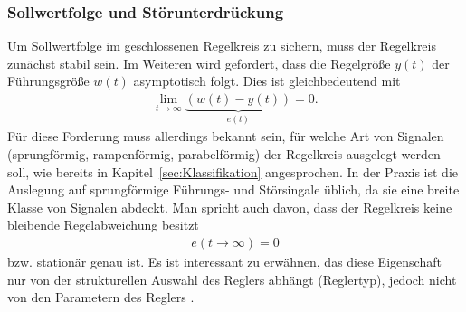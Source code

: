 \subsubsection{Sollwertfolge und Störunterdrückung}
%
Um Sollwertfolge im geschlossenen Regelkreis zu sichern, muss der Regelkreis zunächst stabil sein. Im Weiteren wird gefordert, dass die Regelgröße $y(t)$ der Führungsgröße $w(t)$ asymptotisch folgt. Dies ist gleichbedeutend mit
%
\begin{equation*}
\begin{aligned}
%
\lim\limits_{t\rightarrow\infty}\underbrace{\left(w(t)-y(t)\right)}_{e(t)}=0.
%
\end{aligned}
\end{equation*}  
%
Für diese Forderung muss allerdings bekannt sein, für welche Art von Signalen (sprungförmig, rampenförmig, parabelförmig) der Regelkreis ausgelegt werden soll, wie bereits in Kapitel~\ref{sec:Klassifikation} angesprochen. In der Praxis ist die Auslegung auf sprungförmige Führungs- und Störsingale üblich, da sie eine breite Klasse von Signalen abdeckt. Man spricht auch davon, dass der Regelkreis keine bleibende Regelabweichung besitzt
%
\begin{equation*}
\begin{aligned}
%
e(t\rightarrow\infty)=0
%
\end{aligned}
\end{equation*}  
%
bzw. stationär genau ist. Es ist interessant zu erwähnen, das diese Eigenschaft nur von der strukturellen Auswahl des Reglers abhängt (Reglertyp), jedoch nicht von den Parametern des Reglers \cite{Lunze10}. 
%
